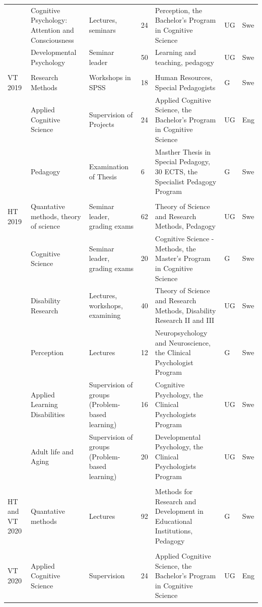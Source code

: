 \documentclass[]{article}
\begin{document}
\begin{landscape}
\begin{ThreePartTable}
\begin{longtable}[t]{l>{\raggedright\arraybackslash}p{5cm}>{\raggedright\arraybackslash}p{5cm}l>{\raggedright\arraybackslash}p{5cm}ll}
 & Cognitive Psychology: Attention and Consciousness & Lectures, seminars & 24 & Perception, the Bachelor's Program in Cognitive Science & UG & Swe\\
 & Developmental Psychology & Seminar leader & 50 & Learning and teaching, pedagogy & UG & Swe\\
 &  &  &  &  &  \vphantom{12} & \\
\addlinespace
VT 2019 & Research Methods & Workshops in SPSS & 18 & Human Resources, Special Pedagogists & G & Swe\\
 & Applied Cognitive Science & Supervision of Projects & 24 & Applied Cognitive Science, the Bachelor's Program in Cognitive Science & UG & Eng\\
 & Pedagogy & Examination of Thesis & 6 & Masther Thesis in Special Pedagogy, 30 ECTS, the Specialist Pedagogy Program & G & Swe\\
 &  &  &  &  &  \vphantom{11} & \\
HT 2019 & Quantative methods, theory of science & Seminar leader, grading exams & 62 & Theory of Science and Research Methods, Pedagogy & UG & Swe\\
\addlinespace
 & Cognitive Science & Seminar leader, grading exams & 20 & Cognitive Science - Methods, the Master's Program in Cognitive Science & G & Swe\\
 & Disability Research & Lectures, workshops, examining & 40 & Theory of Science and Research Methods, Disability Research II and III & UG & Swe\\
 & Perception & Lectures & 12 & Neuropsychology and Neuroscience, the Clinical Psychologist Program & G & Swe\\
 & Applied Learning Disabilities & Supervision of groups (Problem-based learning) & 16 & Cognitive Psychology, the Clinical Psychologists Program & UG & \vphantom{1} Swe\\
 & Adult life and Aging & Supervision of groups (Problem-based learning) & 20 & Developmental Psychology, the Clinical Psychologists Program & UG & \vphantom{1} Swe\\
\addlinespace
 &  &  &  &  &  \vphantom{10} & \\
HT and VT 2020 & Quantative methods & Lectures & 92 & Methods for Research and Development in Educational Institutions, Pedagogy & G & Swe\\
 &  &  &  &  &  \vphantom{9} & \\
VT 2020 & Applied Cognitive Science & Supervision & 24 & Applied Cognitive Science, the Bachelor's Program in Cognitive Science & UG & Eng\\

\end{longtable}
\end{ThreePartTable}
\end{landscape}
\end{document}
